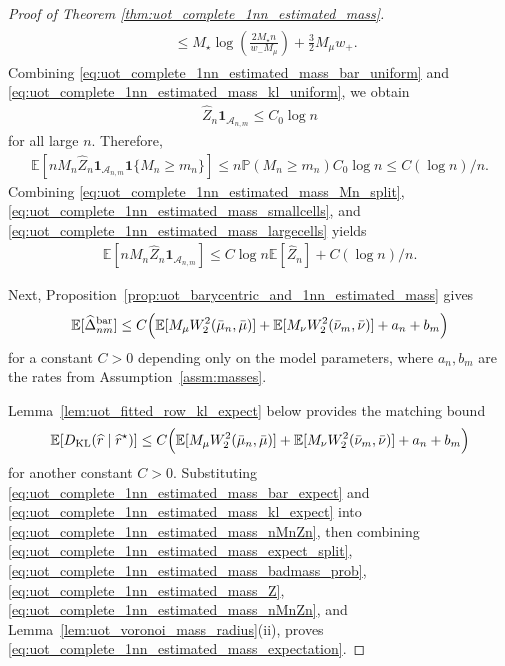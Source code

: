 \documentclass[10pt,a4paper]{amsart}
\newcommand{\Ep}{\mathbb{E}}
\newcommand{\KL}{\mathrm{KL}}
\renewcommand{\hat}{\widehat}
\begin{document}
\begin{proof}[Proof of Theorem \ref{thm:uot_complete_1nn_estimated_mass}]
\begin{align}
\begin{aligned}
    &\le
    M_\star \log\left(\frac{2M_\star n}{w_-M_\mu}\right)
    + \frac{3}{2}M_\mu w_+.
\end{aligned}
\end{align}
Combining \eqref{eq:uot_complete_1nn_estimated_mass_bar_uniform} and
\eqref{eq:uot_complete_1nn_estimated_mass_kl_uniform}, we obtain
\begin{align}
    \hat Z_n\mathbf{1}_{\mathcal{A}_{n,m}}
    \le
    C_0\log n
\end{align}
for all large $n$.
Therefore,
\begin{align}
\label{eq:uot_complete_1nn_estimated_mass_largecells}
    \Ep[nM_n \hat Z_n \mathbf{1}_{\mathcal{A}_{n,m}}\mathbf{1}\{M_n\ge m_n\}]
    \le
    n \mathbb{P}(M_n\ge m_n) C_0\log n
    \le
    C{(\log n)/n}.
\end{align}
Combining \eqref{eq:uot_complete_1nn_estimated_mass_Mn_split},
\eqref{eq:uot_complete_1nn_estimated_mass_smallcells}, and
\eqref{eq:uot_complete_1nn_estimated_mass_largecells} yields
\begin{align}
\label{eq:uot_complete_1nn_estimated_mass_nMnZn}
    \Ep[nM_n \hat Z_n \mathbf{1}_{\mathcal{A}_{n,m}}]
    \le
    C\log n \Ep[\hat Z_n] + C{(\log n)/n}.
\end{align}

Next, Proposition~\ref{prop:uot_barycentric_and_1nn_estimated_mass} gives
\begin{align}
\label{eq:uot_complete_1nn_estimated_mass_bar_expect}
    \Ep[\hat\Delta_{nm}^{\mathrm{bar}}]
    \le
    C
    \Bigl(
        \Ep[M_\mu W_2^2(\bar\mu_n,\bar\mu)]
        +
        \Ep[M_\nu W_2^2(\bar\nu_m,\bar\nu)]
        + a_n + b_m
    \Bigr)
\end{align}
for a constant $C>0$ depending only on the model parameters, where $a_n,b_m$ are the rates from Assumption~\ref{assm:masses}.


Lemma~\ref{lem:uot_fitted_row_kl_expect} below provides the matching bound
\begin{align}
\label{eq:uot_complete_1nn_estimated_mass_kl_expect}
    \Ep[{D_\KL}(\hat r\mid \hat r^\star)]
    \le
    C
    \Bigl(
        \Ep[M_\mu W_2^2(\bar\mu_n,\bar\mu)]
        +
        \Ep[M_\nu W_2^2(\bar\nu_m,\bar\nu)]
        + a_n + b_m
    \Bigr)
\end{align}
for another constant $C>0$.
Substituting \eqref{eq:uot_complete_1nn_estimated_mass_bar_expect} and
\eqref{eq:uot_complete_1nn_estimated_mass_kl_expect} into
\eqref{eq:uot_complete_1nn_estimated_mass_nMnZn}, then combining
\eqref{eq:uot_complete_1nn_estimated_mass_expect_split},
\eqref{eq:uot_complete_1nn_estimated_mass_badmass_prob},
\eqref{eq:uot_complete_1nn_estimated_mass_Z},
\eqref{eq:uot_complete_1nn_estimated_mass_nMnZn}, and
Lemma~\ref{lem:uot_voronoi_mass_radius}(ii), proves
\eqref{eq:uot_complete_1nn_estimated_mass_expectation}.
\end{proof}
\end{document}
